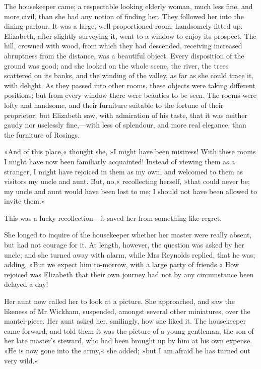 The housekeeper came; a respectable looking elderly woman, much less fine, and more civil, than she had any notion of finding her. They followed her into the dining-parlour. It was a large, well-proportioned room, handsomely fitted up. Elizabeth, after slightly surveying it, went to a window to enjoy its prospect. The hill, crowned with wood, from which they had descended, receiving increased abruptness from the distance, was a beautiful object. Every disposition of the ground was good; and she looked on the whole scene, the river, the trees scattered on its banks, and the winding of the valley, as far as she could trace it, with delight. As they passed into other rooms, these objects were taking different positions; but from every window there were beauties to be seen. The rooms were lofty and handsome, and their furniture suitable to the fortune of their proprietor; but Elizabeth saw, with admiration of his taste, that it was neither gaudy nor uselessly fine,—with less of splendour, and more real elegance, than the furniture of Rosings.

»And of this place,« thought she, »I might have been mistress! With these rooms I might have now been familiarly acquainted! Instead of viewing them as a stranger, I might have rejoiced in them as my own, and welcomed to them as visitors my uncle and aunt. But, no,« recollecting herself, »that could never be; my uncle and aunt would have been lost to me; I should not have been allowed to invite them.«

This was a lucky recollection—it saved her from something like regret.

She longed to inquire of the housekeeper whether her master were really absent, but had not courage for it. At length, however, the question was asked by her uncle; and she turned away with alarm, while Mrs Reynolds replied, that he was; adding, »But we expect him to-morrow, with a large party of friends.« How rejoiced was Elizabeth that their own journey had not by any circumstance been delayed a day!

Her aunt now called her to look at a picture. She approached, and saw the likeness of Mr Wickham, suspended, amongst several other miniatures, over the mantel-piece. Her aunt asked her, smilingly, how she liked it. The housekeeper came forward, and told them it was the picture of a young gentleman, the son of her late master's steward, who had been brought up by him at his own expense. »He is now gone into the army,« she added; »but I am afraid he has turned out very wild.«

